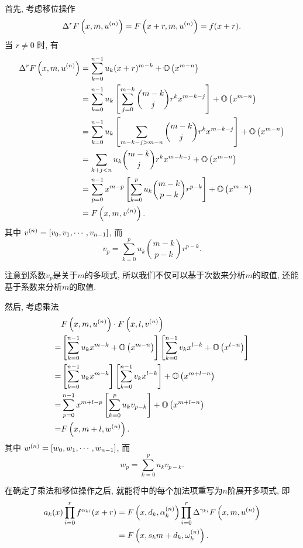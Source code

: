首先, 考虑移位操作
\begin{equation}
\Delta^r F\left(x,m,u^{(n)}\right) = F\left(x+r,m,u^{(n)}\right) = f(x+r).
\end{equation}
当 $r\neq 0$ 时, 有 
\begin{equation}
\begin{split}
\Delta^r F\left(x,m,u^{(n)}\right) &= \sum_{k=0}^{n-1}{u_k (x+r)^{m-k}}+\mathbb O\left(x^{m-n}\right) \\
&= \sum_{k=0}^{n-1}{u_k \left[\sum_{j=0}^{m-k}{\binom{m-k}{j}r^kx^{m-k-j}}\right]}+\mathbb O\left(x^{m-n}\right) \\
&= \sum_{k=0}^{n-1}{u_k \left[\sum_{m-k-j>m-n}{\binom{m-k}{j}r^kx^{m-k-j}}\right]}+\mathbb O\left(x^{m-n}\right) \\
&= \sum_{k+j<n}{u_k {\binom{m-k}{j}r^kx^{m-k-j}}}+\mathbb O\left(x^{m-n}\right) \\
&=\sum_{p=0}^{n-1}{x^{m-p}\left[\sum_{k=0}^p{u_k\binom{m-k}{p-k}r^{p-k}}\right]}+\mathbb O\left(x^{m-n}\right)\\
&=F\left(x,m,v^{(n)}\right).
\end{split} \label{NEM-shift}
\end{equation}
其中 $v^{(n)}=\left[v_0,v_1,\cdots,v_{n-1}\right]$, 而
\begin{equation}
v_p=\sum_{k=0}^p{u_k\binom{m-k}{p-k}r^{p-k}}.
\end{equation}

注意到系数$v_p$是关于$m$的多项式, 所以我们不仅可以基于次数来分析$m$的取值, 还能基于系数来分析$m$的取值. 

然后, 考虑乘法 
\begin{equation}
\begin{split}
& F\left(x,m,u ^{(n)}\right)\cdot F\left(x,l,v^{(n)}\right) \\
=& \left[\sum_{k=0}^{n-1}{u_k x^{m-k}}+\mathbb O\left(x^{m-n}\right)\right]\left[\sum_{k=0}^{n-1}{v_k x^{l-k}}+\mathbb O\left(x^{l-n}\right)\right] \\
=& \left[\sum_{k=0}^{n-1}{u_k x^{m-k}}\right]\left[\sum_{k=0}^{n-1}{v_k x^{l-k}}\right]+\mathbb O\left(x^{m+l-n}\right) \\
=& \sum_{p=0}^{n-1}{x^{m+l-p}\left[\sum_{k=0}^p{u_k v_{p-k}}\right]}+\mathbb O\left(x^{m+l-n}\right) \\
=& F\left(x,m+l,w^{(n)}\right) .
\end{split} \label{NEM-times}
\end{equation}
其中 $w^{(n)}=\left[w_0,w_1,\cdots,w_{n-1}\right]$, 而
\begin{equation}
w_p=\sum_{k=0}^p{u_k v_{p-k}}.
\end{equation}

在确定了乘法和移位操作之后, 就能将中的每个加法项重写为$n$阶展开多项式, 即
\begin{equation}
\begin{split}
a_k(x)\prod_{i=0}^r{f^{\alpha_{ki}}(x+r)}&=F\left(x,d_k,\alpha_k^{(n)}\right)\prod_{i=0}^r{\Delta^{\gamma_{ki}}F\left(x,m,u^{(n)}\right)} \\
&= F\left(x,s_k m+d_k, \omega_k^{(n)}\right) .
\end{split}
\end{equation}

